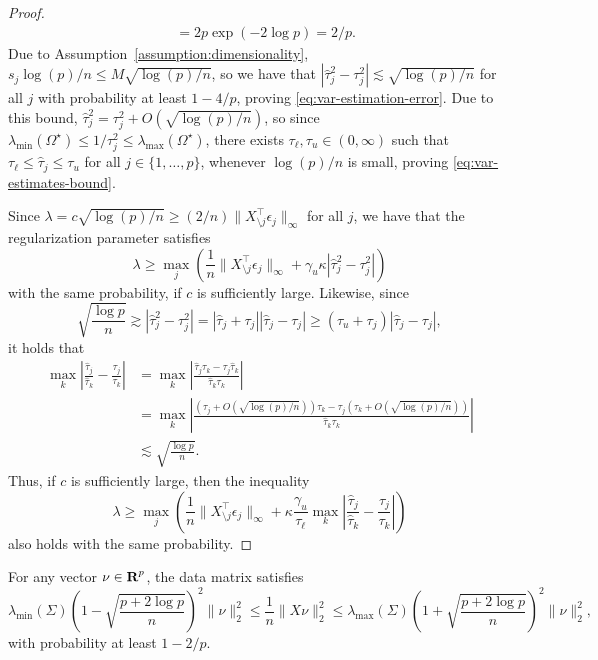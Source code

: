 \documentclass{article}
\begin{document}
\begin{proof}
\[\begin{aligned}
        &= 2p \exp(-2 \log p) = 2/p.
    \end{aligned}
\]
Due to Assumption~\ref{assumption:dimensionality}, $s_j\log(p) / n \leq M
\sqrt{\log (p)/n}$, so we have that $|\hat \tau_j^2 - \tau_j^2| \lesssim
\sqrt{\log(p) / n}$ for all $j$ with probability at least $1 - 4/p$, proving
\eqref{eq:var-estimation-error}. Due to this bound, $\hat\tau_j^2 = \tau_j^2 +
O(\sqrt{\log(p)/n})$, so since $\lambda_\mathrm{min}(\Omega^\star) \leq 1 /
\tau_j^2 \leq \lambda_\mathrm{max}(\Omega^\star)$, there exists
$\tau_\ell,\tau_u \in (0, \infty)$ such that $\tau_\ell \leq \hat \tau_j \leq
\tau_u$ for all $j\in \{1, \dots, p\}$, whenever $\log(p)/n$ is small, proving
\eqref{eq:var-estimates-bound}.

Since $\lambda = c\sqrt{\log(p) / n} \geq (2/n) \|X_{\setminus j}^\top
\epsilon_j\|_\infty$ for all $j$, we have that the regularization parameter
satisfies
\[
    \lambda \geq \max_j \left(\frac{1}{n}\|X_{\setminus j}^\top \epsilon_j\|_\infty + \gamma_u \kappa |\hat \tau_j^2 - \tau_j^2|\right)
\]
with the same probability, if $c$ is sufficiently large. Likewise, since
\[
    \sqrt{\frac{\log p}{n}} \gtrsim |\hat \tau_j^2 - \tau_j^2| = |\hat \tau_j + \tau_j| |\hat \tau_j - \tau_j| \geq (\tau_u + \tau_j) |\hat \tau_j - \tau_j|,
\]
it holds that
\[
    \begin{aligned}
        \max_k \left|\frac{\hat \tau_j}{\hat \tau_k} - \frac{\tau_j}{\tau_k}\right| &= \max_k \left|\frac{\hat \tau_j \tau_k - \tau_j \hat \tau_k}{\hat \tau_k \tau_k}\right| \\
        &= \max_k \left|\frac{\left(\tau_j + O(\sqrt{\log(p)/n})\right) \tau_k - \tau_j \left(\tau_k + O(\sqrt{\log(p)/n})\right)}{\hat \tau_k \tau_k}\right| \\
        &\lesssim \sqrt{\frac{\log p}{n}}.
    \end{aligned}
\]
Thus, if $c$ is sufficiently large, then the inequality
\[
    \lambda \geq \max_j \left(\frac{1}{n}\|X_{\setminus j}^\top \epsilon_j\|_\infty + \kappa \frac{\gamma_u}{\tau_\ell} \max_k \left|\frac{\hat \tau_j}{\hat \tau_k} - \frac{\tau_j}{\tau_k}\right| \right)
\]
also holds with the same probability.
\end{proof}

\begin{lemma}\label{lemma:smallest-eigenvalue}
For any vector $\nu \in {\mbox{\bf R}}^p$, the data matrix satisfies
\[
    \lambda_\mathrm{min}(\Sigma)\left(1 - \sqrt{\frac{p + 2 \log p}{n}}\right)^2 \|\nu\|_2^2 \leq \frac{1}{n} \|X \nu\|_2^2 \leq \lambda_\mathrm{max}(\Sigma)\left(1 + \sqrt{\frac{p + 2 \log p}{n}}\right)^2 \|\nu\|_2^2,
\]
with probability at least $1 - 2/p$.
\end{lemma}
\end{document}
